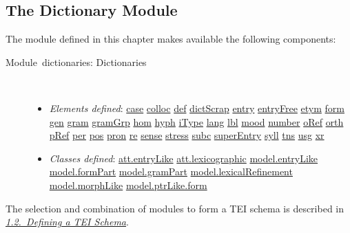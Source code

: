 \subsection[{The Dictionary Module}]{The Dictionary Module}\par
The module defined in this chapter makes available the following components: \begin{description}

\item[{Module dictionaries: Dictionaries}]\hspace{1em}\hfill\linebreak
\mbox{}\\[-10pt] \begin{itemize}
\item {\itshape Elements defined}: \hyperref[TEI.case]{case} \hyperref[TEI.colloc]{colloc} \hyperref[TEI.def]{def} \hyperref[TEI.dictScrap]{dictScrap} \hyperref[TEI.entry]{entry} \hyperref[TEI.entryFree]{entryFree} \hyperref[TEI.etym]{etym} \hyperref[TEI.form]{form} \hyperref[TEI.gen]{gen} \hyperref[TEI.gram]{gram} \hyperref[TEI.gramGrp]{gramGrp} \hyperref[TEI.hom]{hom} \hyperref[TEI.hyph]{hyph} \hyperref[TEI.iType]{iType} \hyperref[TEI.lang]{lang} \hyperref[TEI.lbl]{lbl} \hyperref[TEI.mood]{mood} \hyperref[TEI.number]{number} \hyperref[TEI.oRef]{oRef} \hyperref[TEI.orth]{orth} \hyperref[TEI.pRef]{pRef} \hyperref[TEI.per]{per} \hyperref[TEI.pos]{pos} \hyperref[TEI.pron]{pron} \hyperref[TEI.re]{re} \hyperref[TEI.sense]{sense} \hyperref[TEI.stress]{stress} \hyperref[TEI.subc]{subc} \hyperref[TEI.superEntry]{superEntry} \hyperref[TEI.syll]{syll} \hyperref[TEI.tns]{tns} \hyperref[TEI.usg]{usg} \hyperref[TEI.xr]{xr}
\item {\itshape Classes defined}: \hyperref[TEI.att.entryLike]{att.entryLike} \hyperref[TEI.att.lexicographic]{att.lexicographic} \hyperref[TEI.model.entryLike]{model.entryLike} \hyperref[TEI.model.formPart]{model.formPart} \hyperref[TEI.model.gramPart]{model.gramPart} \hyperref[TEI.model.lexicalRefinement]{model.lexicalRefinement} \hyperref[TEI.model.morphLike]{model.morphLike} \hyperref[TEI.model.ptrLike.form]{model.ptrLike.form}
\end{itemize} 
\end{description}  The selection and combination of modules to form a TEI schema is described in \textit{\hyperref[STIN]{1.2.\ Defining a TEI Schema}}.